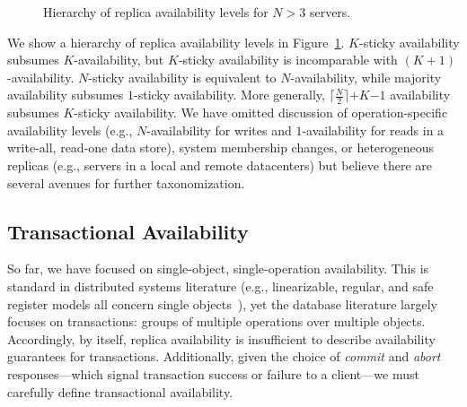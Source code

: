 \begin{figure}
\centering
{}
\caption{Hierarchy of replica availability levels for $N>3$ servers.}
\label{fig:availability-order}
\end{figure}

We show a hierarchy of replica availability levels in
Figure~\ref{fig:availability-order}. $K$-sticky availability subsumes
$K$-availability, but $K$-sticky availability is incomparable with
$(K+1)$-availability. $N$-sticky availability is equivalent to
$N$-availability, while majority availability subsumes $1$-sticky
availability. More generally, $\lceil \frac{N}{2} \rceil$$+$$K$$-$$1$
availability subsumes $K$-sticky availability. We have omitted
discussion of operation-specific availability levels (e.g.,
$N$-availability for writes and $1$-availability for reads in a
write-all, read-one data store), system membership changes, or
heterogeneous replicas (e.g., servers in a local and remote
datacenters) but believe there are several avenues for further
taxonomization.

\subsection{Transactional Availability}

So far, we have focused on single-object, single-operation
availability. This is standard in distributed systems literature
(e.g., linearizable, regular, and safe register models all concern
single objects~\cite{herlihy-art}), yet the database literature
largely focuses on transactions: groups of multiple operations over
multiple objects. Accordingly, by itself, replica availability is
insufficient to describe availability guarantees for
transactions. Additionally, given the choice of \textit{commit} and
\textit{abort} responses---which signal transaction success or failure
to a client---we must carefully define transactional availability.

